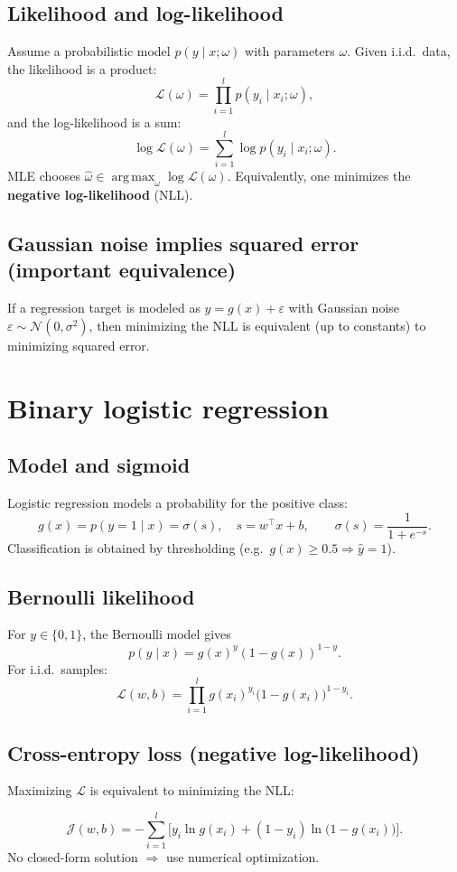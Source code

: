 \documentclass[11pt, oneside]{book}
\newcommand{\argmax}{\operatorname*{arg\,max}}
\newcommand{\1}{\ind}                       %
\newcommand{\sigmoid}{\sigma}               %
\begin{document}
\subsection{Likelihood and log-likelihood}
Assume a probabilistic model $p(y\mid x;\omega)$ with parameters $\omega$.
Given i.i.d.\ data, the likelihood is a product:
\[
  \mathcal{L}(\omega)=\prod_{i=1}^{l} p(y_i\mid x_i;\omega),
\]
and the log-likelihood is a sum:
\[
  \log \mathcal{L}(\omega)=\sum_{i=1}^{l} \log p(y_i\mid x_i;\omega).
\]
MLE chooses $\hat\omega\in\argmax_\omega \log\mathcal{L}(\omega)$.
Equivalently, one minimizes the \textbf{negative log-likelihood} (NLL).

\subsection{Gaussian noise implies squared error (important equivalence)}
If a regression target is modeled as $y=g(x)+\varepsilon$ with Gaussian noise $\varepsilon\sim\mathcal{N}(0,\sigma^2)$, then minimizing the NLL is equivalent (up to constants) to minimizing squared error.

\section{Binary logistic regression}
\subsection{Model and sigmoid}
Logistic regression models a probability for the positive class:
\[
  g(x)=p(y=1\mid x)=\sigmoid(s),\quad s=w^\top x+b,
\qquad
  \sigmoid(s)=\frac{1}{1+e^{-s}}.
\]
Classification is obtained by thresholding (e.g.\ $g(x)\ge 0.5 \Rightarrow \hat y=1$).

\subsection{Bernoulli likelihood}
For $y\in\{0,1\}$, the Bernoulli model gives
\[
p(y\mid x)=g(x)^y(1-g(x))^{1-y}.
\]
For i.i.d.\ samples:
\[
\mathcal{L}(w,b)=\prod_{i=1}^{l} g(x_i)^{y_i}\big(1-g(x_i)\big)^{1-y_i}.
\]

\subsection{Cross-entropy loss (negative log-likelihood)}
Maximizing $\mathcal{L}$ is equivalent to minimizing the NLL:
\begin{thmbox}[title={Binary Cross-Entropy / NLL}]
\[
  \mathcal{J}(w,b)= -\sum_{i=1}^{l}\Big[y_i\ln g(x_i) + (1-y_i)\ln\big(1-g(x_i)\big)\Big].
\]
No closed-form solution $\Rightarrow$ use numerical optimization.
\end{thmbox}
\end{document}
